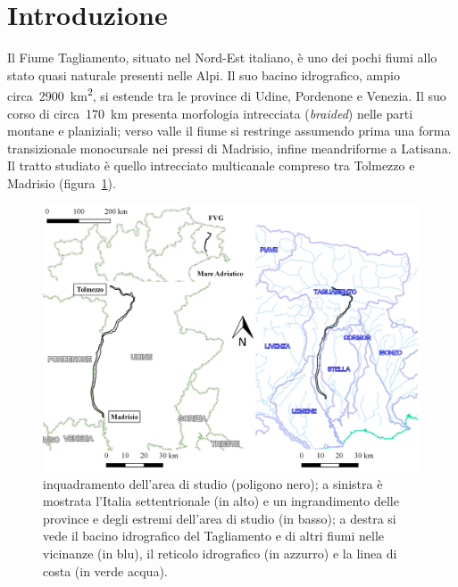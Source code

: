 \documentclass[12pt,a4paper]{article}
\begin{document}
\section{Introduzione}
Il Fiume Tagliamento, situato nel Nord-Est italiano, è uno dei pochi fiumi allo stato quasi naturale presenti nelle Alpi. 
Il suo bacino idrografico, ampio circa~\SI{2900}{\kilo\m\tothe{2}}, si estende tra le province di Udine, Pordenone e Venezia.
Il suo corso di circa~\SI{170}{\kilo\m} presenta morfologia intrecciata (\emph{braided}) nelle parti montane e planiziali; verso valle il fiume si restringe assumendo prima una forma transizionale monocursale nei pressi di Madrisio, infine meandriforme a Latisana.
\\
Il tratto studiato è quello intrecciato multicanale compreso tra Tolmezzo e Madrisio (figura~\ref{fig:overview}).
%
\begin{figure}[ht]
	\centering
	\includegraphics[width=\textwidth]{files/overview.jpeg}
	\caption[inquadramento dell'area di studio]
		{inquadramento dell'area di studio (poligono nero); a sinistra è mostrata l'Italia settentrionale (in alto) e un ingrandimento delle province e degli estremi dell'area di studio (in basso); a destra si vede il bacino idrografico del Tagliamento e di altri fiumi nelle vicinanze (in blu), il reticolo idrografico (in azzurro) e la linea di costa (in verde acqua).}
	\label{fig:overview}
\end{figure}
%
\end{document}

